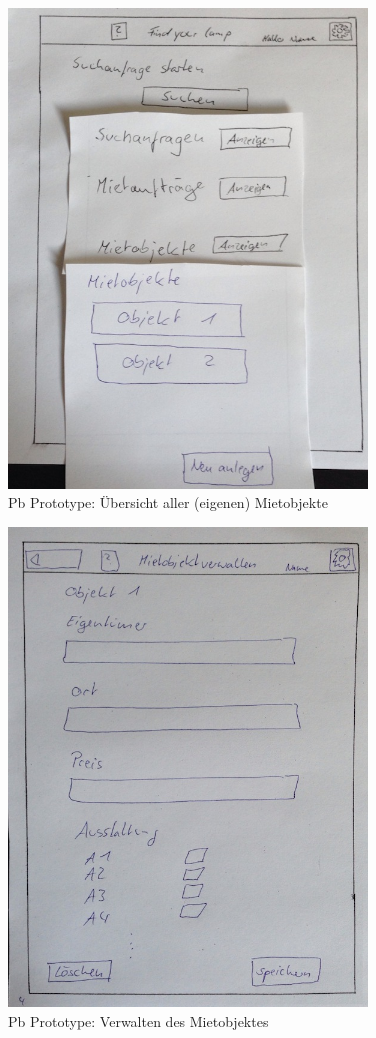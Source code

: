 \begin{figure}[H]
\centering
\includegraphics[angle=90, width=0.85\textwidth]{./images/paperbased/objekte.JPG}
\caption{Pb Prototype: Übersicht aller (eigenen) Mietobjekte}
\label{pbprototype9}
\end{figure}

\begin{figure}[H]
\centering
\includegraphics[angle=90, width=0.85\textwidth]{./images/paperbased/objektveralten.JPG}
\caption{Pb Prototype: Verwalten des Mietobjektes}
\label{pbprototype10}
\end{figure}


